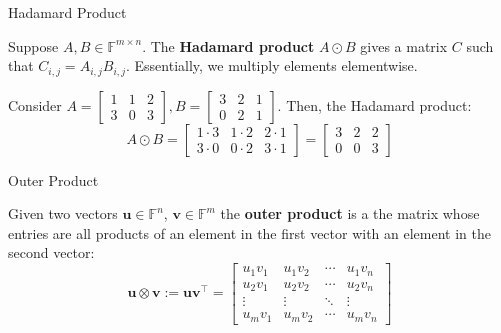 \documentclass{zkdl-presentation-template}
\begin{document}
    \begin{frame}{Hadamard Product}
        \begin{definition}
            Suppose $A,B \in \mathbb{F}^{m \times n}$. The \textbf{Hadamard product} $A \odot B$ 
            gives a matrix $C$ such that $C_{i,j} = A_{i,j}B_{i,j}$. Essentially, we multiply 
            elements elementwise.
        \end{definition}
        
        \begin{example}
            Consider $A = \begin{bmatrix}
                1 & 1 & 2 \\
                3 & 0 & 3
            \end{bmatrix}, B = \begin{bmatrix}
                3 & 2 & 1 \\ 0 & 2 & 1
            \end{bmatrix}$. Then, the Hadamard product:
            \begin{equation*}
                A \odot B = \begin{bmatrix}
                    1 \cdot 3 & 1 \cdot 2 & 2 \cdot 1 \\
                    3 \cdot 0 & 0 \cdot 2 & 3 \cdot 1
                \end{bmatrix} = \begin{bmatrix}
                    3 & 2 & 2 \\
                    0 & 0 & 3
                \end{bmatrix}
            \end{equation*}
        \end{example}
    \end{frame}

    \begin{frame}{Outer Product}
        \begin{definition}
            Given two vectors $\boldsymbol{u} \in \mathbb{F}^n$, $\boldsymbol{v} \in \mathbb{F}^m$ the 
            \textbf{outer product} is a the matrix whose entries are all products of an element in
            the first vector with an element in the second vector:
            \begin{equation*}
                \boldsymbol{u} \otimes \boldsymbol{v} := \boldsymbol{u}\boldsymbol{v}^{\top} = \begin{bmatrix}
                    u_1 v_1 & u_1 v_2 & \cdots & u_1 v_n \\
                    u_2 v_1 & u_2 v_2 & \cdots & u_2 v_n \\
                    \vdots & \vdots & \ddots & \vdots \\
                    u_m v_1 & u_m v_2 & \cdots & u_m v_n
                \end{bmatrix}
            \end{equation*}
        \end{definition}
    \end{frame}
\end{document}
